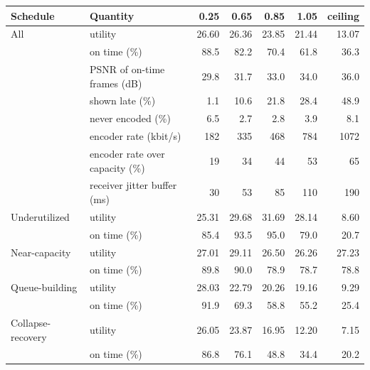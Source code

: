 \begin{tabular}{llrrrrr}
\toprule
Schedule & Quantity & 0.25 & 0.65 & 0.85 & 1.05 & ceiling \\
\midrule
All & utility & 26.60 & 26.36 & 23.85 & 21.44 & 13.07 \\
 & on time (\%) & 88.5 & 82.2 & 70.4 & 61.8 & 36.3 \\
 & PSNR of on-time frames (dB) & 29.8 & 31.7 & 33.0 & 34.0 & 36.0 \\
 & shown late (\%) & 1.1 & 10.6 & 21.8 & 28.4 & 48.9 \\
 & never encoded (\%) & 6.5 & 2.7 & 2.8 & 3.9 & 8.1 \\
 & encoder rate (kbit/s) & 182 & 335 & 468 & 784 & 1072 \\
 & encoder rate over capacity (\%) & 19 & 34 & 44 & 53 & 65 \\
 & receiver jitter buffer (ms) & 30 & 53 & 85 & 110 & 190 \\
\midrule
Underutilized & utility & 25.31 & 29.68 & 31.69 & 28.14 & 8.60 \\
 & on time (\%) & 85.4 & 93.5 & 95.0 & 79.0 & 20.7 \\
Near-capacity & utility & 27.01 & 29.11 & 26.50 & 26.26 & 27.23 \\
 & on time (\%) & 89.8 & 90.0 & 78.9 & 78.7 & 78.8 \\
Queue-building & utility & 28.03 & 22.79 & 20.26 & 19.16 & 9.29 \\
 & on time (\%) & 91.9 & 69.3 & 58.8 & 55.2 & 25.4 \\
Collapse-recovery & utility & 26.05 & 23.87 & 16.95 & 12.20 & 7.15 \\
 & on time (\%) & 86.8 & 76.1 & 48.8 & 34.4 & 20.2 \\
\bottomrule
\end{tabular}
